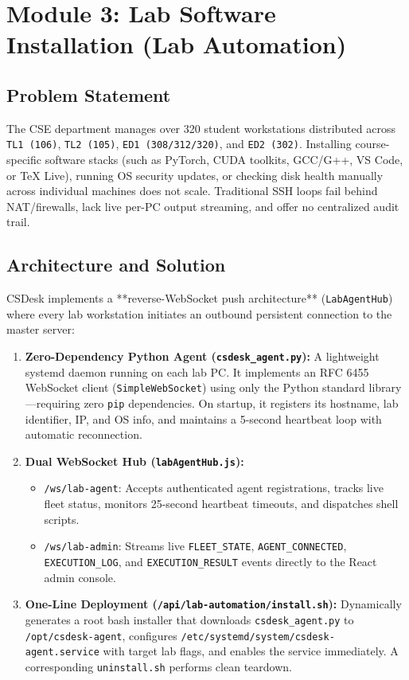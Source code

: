 \documentclass[12pt,a4paper]{article}
\begin{document}
\section{Module 3: Lab Software Installation (Lab Automation)}

\subsection{Problem Statement}
The CSE department manages over 320 student workstations distributed across \texttt{TL1 (106)}, \texttt{TL2 (105)}, \texttt{ED1 (308/312/320)}, and \texttt{ED2 (302)}. Installing course-specific software stacks (such as PyTorch, CUDA toolkits, GCC/G++, VS Code, or \TeX{} Live), running OS security updates, or checking disk health manually across individual machines does not scale. Traditional SSH loops fail behind NAT/firewalls, lack live per-PC output streaming, and offer no centralized audit trail.

\subsection{Architecture and Solution}
CSDesk implements a **reverse-WebSocket push architecture** (\texttt{LabAgentHub}) where every lab workstation initiates an outbound persistent connection to the master server:

\begin{enumerate}[leftmargin=*]
    \item \textbf{Zero-Dependency Python Agent (\texttt{csdesk\_agent.py}):} A lightweight systemd daemon running on each lab PC. It implements an RFC 6455 WebSocket client (\texttt{SimpleWebSocket}) using only the Python standard library—requiring zero \texttt{pip} dependencies. On startup, it registers its hostname, lab identifier, IP, and OS info, and maintains a 5-second heartbeat loop with automatic reconnection.
    \item \textbf{Dual WebSocket Hub (\texttt{labAgentHub.js}):}
    \begin{itemize}
        \item \texttt{/ws/lab-agent}: Accepts authenticated agent registrations, tracks live fleet status, monitors 25-second heartbeat timeouts, and dispatches shell scripts.
        \item \texttt{/ws/lab-admin}: Streams live \texttt{FLEET\_STATE}, \texttt{AGENT\_CONNECTED}, \texttt{EXECUTION\_LOG}, and \texttt{EXECUTION\_RESULT} events directly to the React admin console.
    \end{itemize}
    \item \textbf{One-Line Deployment (\texttt{/api/lab-automation/install.sh}):} Dynamically generates a root bash installer that downloads \texttt{csdesk\_agent.py} to \texttt{/opt/csdesk-agent}, configures \texttt{/etc/systemd/system/csdesk-agent.service} with target lab flags, and enables the service immediately. A corresponding \texttt{uninstall.sh} performs clean teardown.
\end{enumerate}
\end{document}
